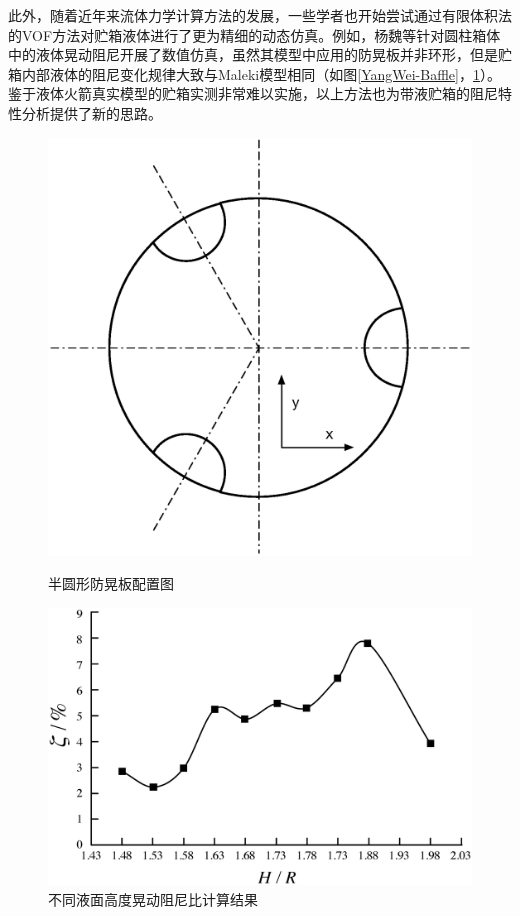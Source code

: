 此外，随着近年来流体力学计算方法的发展，一些学者也开始尝试通过有限体积法的VOF方法对贮箱液体进行了更为精细的动态仿真。例如，杨魏等针对圆柱箱体中的液体晃动阻尼开展了数值仿真\cite{YangWei:2009}，虽然其模型中应用的防晃板并非环形，但是贮箱内部液体的阻尼变化规律大致与Maleki模型相同（如图\ref{YangWei-Baffle}，\ref{Damping-Ration-Yang}）。鉴于液体火箭真实模型的贮箱实测非常难以实施，以上方法也为带液贮箱的阻尼特性分析提供了新的思路。

\begin{figure}[!htb]
\begin{minipage}[b]{0.35\textwidth}
  \centering
  \includegraphics[width=\linewidth]{Baffle}
  \caption{半圆形防晃板配置图}\label{YangWei-Baffle}
\end{minipage}
\begin{minipage}[b]{0.55\textwidth}
  \centering
  \includegraphics[width=\linewidth]{Damping-Ration-Yang}
  \caption{不同液面高度晃动阻尼比计算结果}\label{Damping-Ration-Yang}
\end{minipage}
\end{figure}

